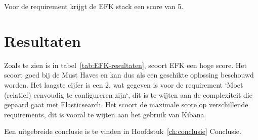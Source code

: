 Voor de requirement krijgt de EFK stack een score van 5.

\section{Resultaten}

Zoals te zien is in tabel~\ref{tab:EFK-resultaten}, scoort EFK een hoge score. Het scoort goed bij de Must Haves en kan dus als een geschikte oplossing beschouwd worden. Het laagste cijfer is een 2, wat gegeven is voor de requirement `Moet (relatief) eenvoudig te configureren zijn`, dit is te wijten aan de complexiteit die gepaard gaat met Elasticsearch. Het scoort de maximale score op verschillende requirements, dit is vooral te wijten aan het gebruik van Kibana.

Een uitgebreide conclusie is te vinden in Hoofdstuk~\ref{ch:conclusie} Conclusie.

